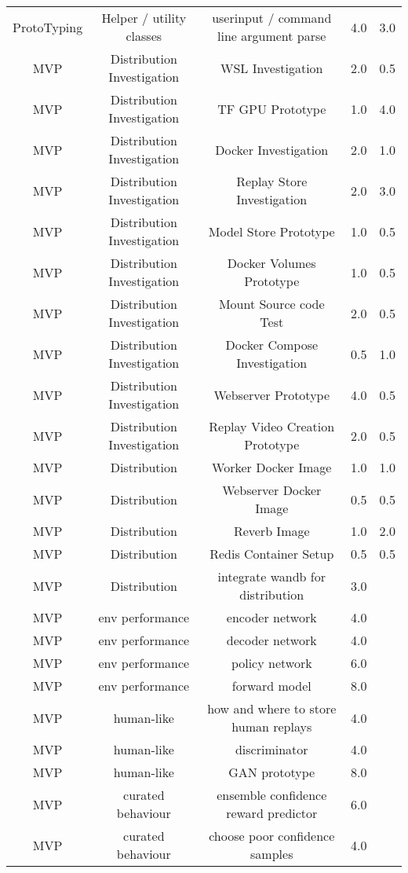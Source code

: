 \begin{longtable}{|c|c|c|c|c|}
	ProtoTyping & Helper / utility classes & userinput / command line argument parse & 4.0 & 3.0 \\
	MVP & Distribution Investigation & WSL Investigation & 2.0 & 0.5 \\
	MVP & Distribution Investigation & TF GPU Prototype & 1.0 & 4.0 \\
	MVP & Distribution Investigation & Docker Investigation & 2.0 & 1.0 \\
	MVP & Distribution Investigation & Replay Store Investigation & 2.0 & 3.0 \\
	MVP & Distribution Investigation & Model Store Prototype & 1.0 & 0.5 \\
	MVP & Distribution Investigation & Docker Volumes Prototype & 1.0 & 0.5 \\
	MVP & Distribution Investigation & Mount Source code Test & 2.0 & 0.5 \\
	MVP & Distribution Investigation & Docker Compose Investigation & 0.5 & 1.0 \\
	MVP & Distribution Investigation & Webserver Prototype & 4.0 & 0.5 \\
	MVP & Distribution Investigation & Replay Video Creation Prototype & 2.0 & 0.5 \\
	MVP & Distribution & Worker Docker Image & 1.0 & 1.0 \\
	MVP & Distribution & Webserver Docker Image & 0.5 & 0.5 \\
	MVP & Distribution & Reverb Image & 1.0 & 2.0 \\
	MVP & Distribution & Redis Container Setup  & 0.5 & 0.5 \\
	MVP & Distribution & integrate wandb for distribution & 3.0 &  \\
	MVP & env performance & encoder network & 4.0 &  \\
	MVP & env performance & decoder network & 4.0 &  \\
	MVP & env performance & policy network & 6.0 &  \\
	MVP & env performance & forward model & 8.0 &  \\
	MVP & human-like & how and where to store human replays & 4.0 &  \\
	MVP & human-like & discriminator & 4.0 &  \\
	MVP & human-like & GAN prototype & 8.0 &  \\
	MVP & curated behaviour & ensemble confidence reward predictor & 6.0 &  \\
	MVP & curated behaviour & choose poor confidence samples & 4.0 &  \\

\end{longtable}
